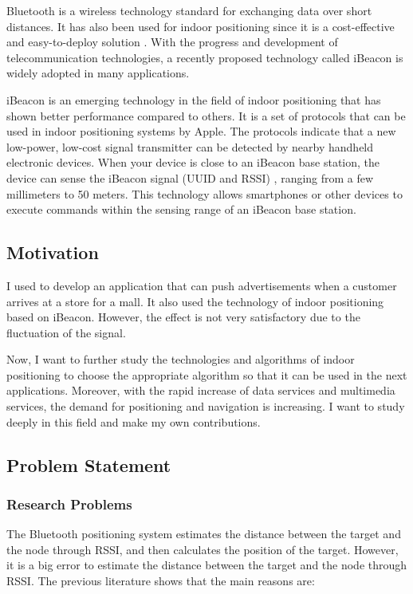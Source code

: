 \documentclass{sigchi}
\begin{document}
Bluetooth is a wireless technology standard for exchanging data over short distances. It has also been used for indoor positioning since it is a cost-effective and easy-to-deploy solution \cite{heydon2012bluetooth}. With the progress and development of telecommunication technologies, a recently proposed technology called iBeacon is widely adopted in many applications.

iBeacon is an emerging technology in the field of indoor positioning that has shown better performance compared to others. It is a set of protocols that can be used in indoor positioning systems by Apple. The protocols indicate that a new low-power, low-cost signal transmitter can be detected by nearby handheld electronic devices. When your device is close to an iBeacon base station, the device can sense the iBeacon signal (UUID and RSSI) \cite{feldmann2003indoor}, ranging from a few millimeters to 50 meters. This technology allows smartphones or other devices to execute commands within the sensing range of an iBeacon base station.

\subsection{Motivation}
I used to develop an application that can push advertisements when a customer arrives at a store for a mall. It also used the technology of indoor positioning based on iBeacon. However, the effect is not very satisfactory due to the fluctuation of the signal.
 
Now, I want to further study the technologies and algorithms of indoor positioning to choose the appropriate algorithm so that it can be used in the next applications. Moreover, with the rapid increase of data services and multimedia services, the demand for positioning and navigation is increasing. I want to study deeply in this field and make my own contributions.

\subsection{Problem Statement}

\subsubsection{Research Problems}
The Bluetooth positioning system estimates the distance between the target and the node through RSSI, and then calculates the position of the target. However, it is a big error to estimate the distance between the target and the node through RSSI. The previous literature shows that the main reasons are:
\end{document}
